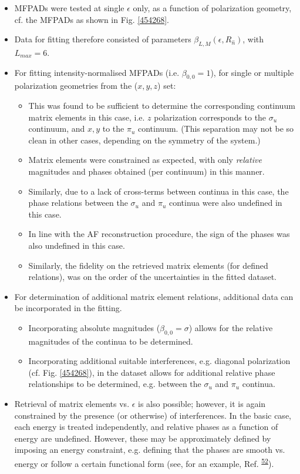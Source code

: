 \documentclass[10pt]{article}
\begin{document}
\begin{itemize}
\item MFPADs were tested at single $\epsilon$ only, as a function of polarization geometry, cf. the MFPADs as shown in Fig. \ref{454268}.
\item Data for fitting therefore consisted of parameters $\beta_{L,M}(\epsilon,R_{\hat{n}})$, with $L_{max}=6$.
\item For fitting intensity-normalised MFPADs (i.e. $\beta_{0,0}=1$), for single or multiple polarization geometries from the ($x,y,z$) set:
\begin{itemize}
\item This was found to be sufficient to determine the corresponding continuum matrix elements in this case, i.e. $z$ polarization corresponds to the $\sigma_u$ continuum, and $x,y$ to the $\pi_u$ continuum. (This separation may not be so clean in other cases, depending on the symmetry of the system.)
\item Matrix elements were constrained as expected, with only \textit{relative} magnitudes and phases obtained (per continuum) in this manner.
\item Similarly, due to a lack of cross-terms between continua in this case, the phase relations between the $\sigma_u$ and $\pi_u$ continua were also undefined in this case.
\item In line with the AF reconstruction procedure, the sign of the phases was also undefined in this case.
\item Similarly, the fidelity on the retrieved matrix elements (for defined relations), was on the order of the uncertainties in the fitted dataset.
\end{itemize}
\item For determination of additional matrix element relations, additional data can be incorporated in the fitting.
\begin{itemize}
\item Incorporating absolute magnitudes ($\beta_{0,0}=\sigma$) allows for the relative magnitudes of the continua to be determined.
\item Incorporating additional suitable interferences, e.g. diagonal polarization (cf. Fig. \ref{454268}), in the dataset allows for additional relative phase relationships to be determined, e.g. between the $\sigma_u$ and $\pi_u$ continua.
\end{itemize}
\item Retrieval of matrix elements vs. $\epsilon$ is also possible; however, it is again constrained by the presence (or otherwise) of interferences. In the basic case, each energy is treated independently, and relative phases as a function of energy are undefined. However, these may be approximately defined by imposing an energy constraint, e.g. defining that the phases are smooth vs. energy or follow a certain functional form (see, for an example, Ref. \textsuperscript{\hyperref[csl:52]{52}}). %
\end{itemize}
\end{document}
